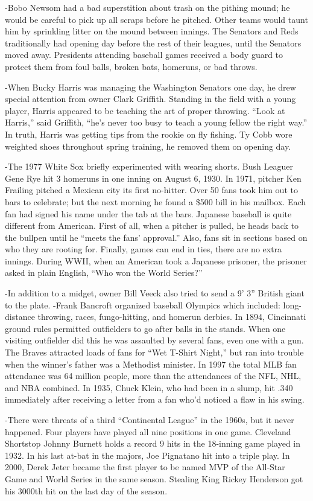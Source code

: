 \documentclass[
]{article}
\begin{document}
-Bobo Newsom had a bad superstition about trash on the pithing mound; he
would be careful to pick up all scraps before he pitched. Other teams
would taunt him by sprinkling litter on the mound between innings. The
Senators and Reds traditionally had opening day before the rest of their
leagues, until the Senators moved away. Presidents attending baseball
games received a body guard to protect them from foul balls, broken
bats, homeruns, or bad throws.

-When Bucky Harris was managing the Washington Senators one day, he drew
special attention from owner Clark Griffith. Standing in the field with
a young player, Harris appeared to be teaching the art of proper
throwing. ``Look at Harris,'' said Griffith, ``he's never too busy to
teach a young fellow the right way.'' In truth, Harris was getting tips
from the rookie on fly fishing. Ty Cobb wore weighted shoes throughout
spring training, he removed them on opening day.

-The 1977 White Sox briefly experimented with wearing shorts. Bush
Leaguer Gene Rye hit 3 homeruns in one inning on August 6, 1930. In
1971, pitcher Ken Frailing pitched a Mexican city its first no-hitter.
Over 50 fans took him out to bars to celebrate; but the next morning he
found a \$500 bill in his mailbox. Each fan had signed his name under
the tab at the bars. Japanese baseball is quite different from American.
First of all, when a pitcher is pulled, he heads back to the bullpen
until he ``meets the fans' approval.'' Also, fans sit in sections based
on who they are rooting for. Finally, games can end in ties, there are
no extra innings. During WWII, when an American took a Japanese
prisoner, the prisoner asked in plain English, ``Who won the World
Series?''

-In addition to a midget, owner Bill Veeck also tried to send a 9' 3''
British giant to the plate. -Frank Bancroft organized baseball Olympics
which included: long-distance throwing, races, fungo-hitting, and
homerun derbies. In 1894, Cincinnati ground rules permitted outfielders
to go after balls in the stands. When one visiting outfielder did this
he was assaulted by several fans, even one with a gun. The Braves
attracted loads of fans for ``Wet T-Shirt Night,'' but ran into trouble
when the winner's father was a Methodist minister. In 1997 the total MLB
fan attendance was 64 million people, more than the attendances of the
NFL, NHL, and NBA combined. In 1935, Chuck Klein, who had been in a
slump, hit .340 immediately after receiving a letter from a fan who'd
noticed a flaw in his swing.

-There were threats of a third ``Continental League'' in the 1960s, but
it never happened. Four players have played all nine positions in one
game. Cleveland Shortstop Johnny Burnett holds a record 9 hits in the
18-inning game played in 1932. In his last at-bat in the majors, Joe
Pignatano hit into a triple play. In 2000, Derek Jeter became the first
player to be named MVP of the All-Star Game and World Series in the same
season. Stealing King Rickey Henderson got his 3000th hit on the last
day of the season.
\end{document}
